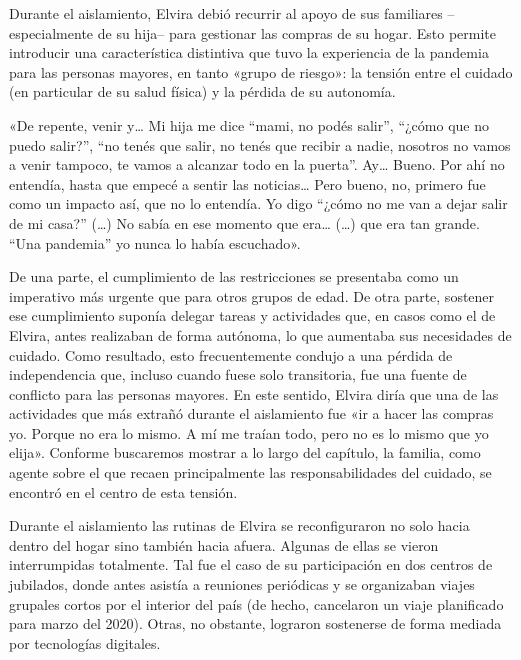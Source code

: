 \begin{refsection}
\begin{gbcita}
\end{gbcita}

Durante el aislamiento, Elvira debió recurrir al apoyo de sus familiares –especialmente de su hija– para gestionar las compras de su hogar. Esto permite introducir una característica distintiva que tuvo la experiencia de la pandemia para las personas mayores, en tanto «grupo de riesgo»: la tensión entre el cuidado (en particular de su salud física) y la pérdida de su autonomía.


\begin{gbcita}
«De repente, venir y… Mi hija me dice “mami, no podés salir”, “¿cómo que no puedo salir?”, “no tenés que salir, no tenés que recibir a nadie, nosotros no vamos a venir tampoco, te vamos a alcanzar todo en la puerta”. Ay… Bueno. Por ahí no entendía, hasta que empecé a sentir las noticias… Pero bueno, no, primero fue como un impacto así, que no lo entendía. Yo digo “¿cómo no me van a dejar salir de mi casa?” (…) No sabía en ese momento que era… (…) que era tan grande. “Una pandemia” yo nunca lo había escuchado».

\end{gbcita}

De una parte, el cumplimiento de las restricciones se presentaba como un imperativo más urgente que para otros grupos de edad. De otra parte, sostener ese cumplimiento suponía delegar tareas y actividades que, en casos como el de Elvira, antes realizaban de forma autónoma, lo que aumentaba sus necesidades de cuidado. Como resultado, esto frecuentemente condujo a una pérdida de independencia que, incluso cuando fuese solo transitoria, fue una fuente de conflicto para las personas mayores. En este sentido, Elvira diría que una de las actividades que más extrañó durante el aislamiento fue «ir a hacer las compras yo. Porque no era lo mismo. A mí me traían todo, pero no es lo mismo que yo elija». Conforme buscaremos mostrar a lo largo del capítulo, la familia, como agente sobre el que recaen principalmente las responsabilidades del cuidado, se encontró en el centro de esta tensión.

Durante el aislamiento las rutinas de Elvira se reconfiguraron no solo hacia dentro del hogar sino también hacia afuera. Algunas de ellas se vieron interrumpidas totalmente. Tal fue el caso de su participación en dos centros de jubilados, donde antes asistía a reuniones periódicas y se organizaban viajes grupales cortos por el interior del país (de hecho, cancelaron un viaje planificado para marzo del 2020). Otras, no obstante, lograron sostenerse de forma mediada por tecnologías digitales.


\end{refsection}
